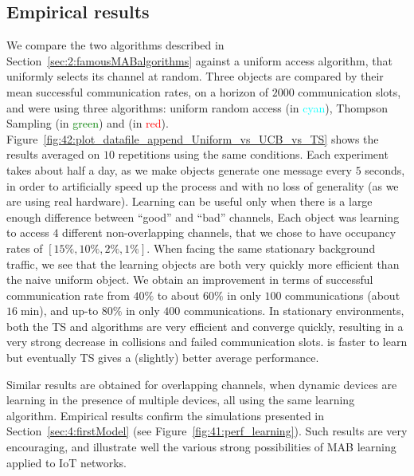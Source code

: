 \subsection{Empirical results}
\label{sub:42:results}

We compare the two algorithms described in Section~\ref{sec:2:famousMABalgorithms} against a uniform access algorithm, that uniformly selects its channel at random.
Three objects are compared by their mean successful communication rates, on a horizon of $2000$ communication slots, and were using three algorithms: uniform random access (in \textcolor{cyan}{cyan}), Thompson Sampling (in \textcolor{green}{green}) and \UCB{} (in \textcolor{red}{red}).
Figure~\ref{fig:42:plot_datafile_append_Uniform_vs_UCB_vs_TS} shows the results averaged on $10$ repetitions using the same conditions.
%
Each experiment takes about half a day,
as we make objects generate one message every $5$ seconds, in order to artificially speed up the process and with no loss of generality (as we are using real hardware).
Learning can be useful only when there is a large enough difference between ``good'' and ``bad'' channels,
Each object was learning to access $4$ different non-overlapping channels, that we chose to have occupancy rates of $[15\%, 10\%, 2\%, 1\%]$.
When facing the same stationary background traffic, we see that the learning objects are both very quickly more efficient than the naive uniform object.
We obtain an improvement in terms of successful communication rate from $40\%$ to about $60\%$ in only $100$ communications (about $16\;\mathrm{min}$), and up-to $80\%$ in only $400$ communications.
%
In stationary environments, both the TS and \UCB{} algorithms are very efficient and converge quickly, resulting in a very strong decrease in collisions and failed communication slots. \UCB{} is faster to learn but eventually TS gives a (slightly) better average performance.

Similar results are obtained for overlapping channels, when dynamic devices are learning in the presence of multiple devices, all using the same learning algorithm.
Empirical results confirm the simulations presented in Section~\ref{sec:4:firstModel} (see Figure~\ref{fig:41:perf_learning}).
Such results are very encouraging, and illustrate well the various strong possibilities of MAB learning applied to IoT networks.


